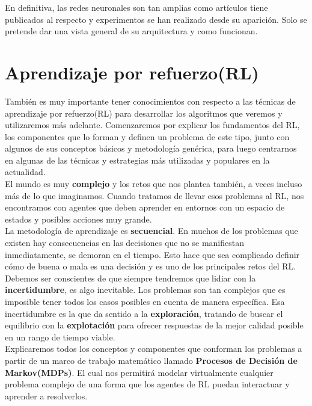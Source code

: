\documentclass[11pt,fleqn]{book} %
\begin{document}
En definitiva, las redes neuronales son tan amplias como artículos tiene publicados al respecto y experimentos se han realizado desde su aparición. Solo se pretende dar una vista general de su arquitectura y como funcionan. 

\chapter{Aprendizaje por refuerzo(RL)}\label{sec:RL}

También es muy importante tener conocimientos con respecto a las técnicas de aprendizaje por refuerzo(RL) para desarrollar los algoritmos que veremos y utilizaremos más adelante. Comenzaremos por explicar los fundamentos del RL, los componentes que lo forman y definen un problema de este tipo, junto con algunos de sus conceptos básicos y metodología genérica, para luego centrarnos en algunas de las técnicas y estrategias más utilizadas y populares en la actualidad. \\

El mundo es muy \textbf{complejo} y los retos que nos plantea también, a veces incluso más de lo que imaginamos. Cuando tratamos de llevar esos problemas al RL, nos encontramos con agentes que deben aprender en entornos con un espacio de estados y posibles acciones muy grande. \\

La metodología de aprendizaje es \textbf{secuencial}. En muchos de los problemas que existen hay consecuencias en las decisiones que no se manifiestan inmediatamente, se demoran en el tiempo. Esto hace que sea complicado definir cómo de buena o mala es una decisión y es uno de los principales retos del RL. \\

Debemos ser conscientes de que siempre tendremos que lidiar con la \textbf{incertidumbre}, es algo inevitable. Los problemas son tan complejos que es imposible tener todos los casos posibles en cuenta de manera específica. Esa incertidumbre es la que da sentido a la \textbf{exploración}, tratando de buscar el equilibrio con la \textbf{explotación} para ofrecer respuestas de la mejor calidad posible en un rango de tiempo viable.\\

Explicaremos todos los conceptos y componentes que conforman los problemas a partir de un marco de trabajo matemático llamado \textbf{Procesos de Decisión de Markov(MDPs)}. El cual nos permitirá modelar virtualmente cualquier problema complejo de una forma que los agentes de RL puedan interactuar y aprender a resolverlos. \cite{book:miguel} \cite{article:RLromero} \cite{book:barto}  \\ 
\end{document}
